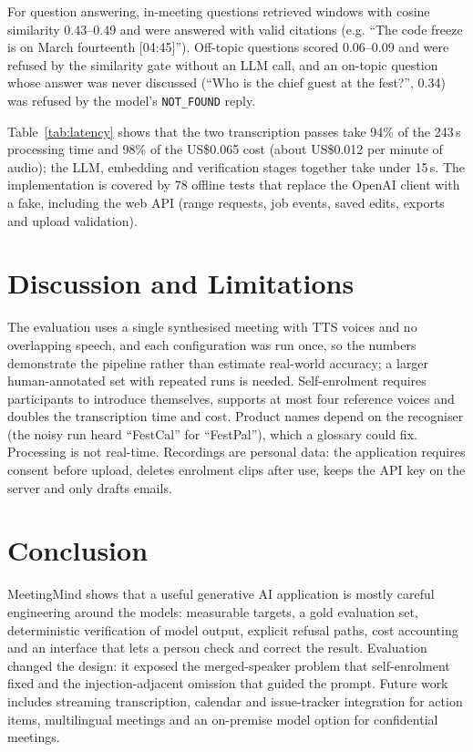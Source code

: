\documentclass[conference]{IEEEtran}
\begin{document}
For question answering, in-meeting questions retrieved windows with cosine similarity 0.43--0.49 and were answered with valid
citations (e.g. ``The code freeze is on March fourteenth [04:45]''). Off-topic questions scored 0.06--0.09 and were refused by
the similarity gate without an LLM call, and an on-topic question whose answer was never discussed (``Who is the chief guest at
the fest?'', 0.34) was refused by the model's \texttt{NOT\_FOUND} reply.

Table~\ref{tab:latency} shows that the two transcription passes take 94\% of the 243\,s processing time and 98\% of the
US\$0.065 cost (about US\$0.012 per minute of audio); the LLM, embedding and verification stages together take under 15\,s.
The implementation is covered by 78 offline tests that replace the OpenAI client with a fake, including the web API
(range requests, job events, saved edits, exports and upload validation).

\section{Discussion and Limitations}
The evaluation uses a single synthesised meeting with TTS voices and no overlapping speech, and each configuration was run once,
so the numbers demonstrate the pipeline rather than estimate real-world accuracy; a larger human-annotated set with repeated runs
is needed. Self-enrolment requires participants to introduce themselves, supports at most four reference voices and doubles the
transcription time and cost. Product names depend on the recogniser (the noisy run heard ``FestCal'' for ``FestPal''), which a
glossary could fix. Processing is not real-time. Recordings are personal data: the application requires consent before upload,
deletes enrolment clips after use, keeps the API key on the server and only drafts emails.

\section{Conclusion}
MeetingMind shows that a useful generative AI application is mostly careful engineering around the models: measurable targets, a
gold evaluation set, deterministic verification of model output, explicit refusal paths, cost accounting and an interface that
lets a person check and correct the result. Evaluation changed the design: it exposed the merged-speaker problem that
self-enrolment fixed and the injection-adjacent omission that guided the prompt. Future work includes streaming transcription,
calendar and issue-tracker integration for action items, multilingual meetings and an on-premise model option for confidential
meetings.
\end{document}
